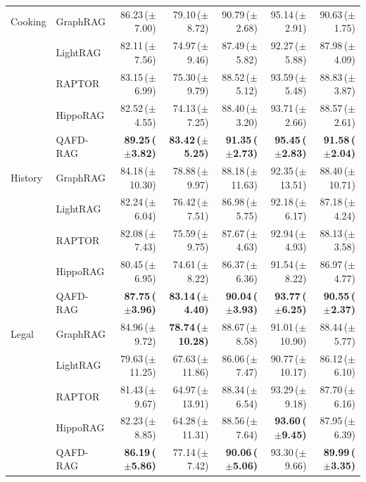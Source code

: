\documentclass{article} %
\newcommand{\score}[2]{#1\,($\pm$#2)}   %
\newcommand{\best}[1]{\textbf{#1}}      %
\begin{document}
\begin{table}[t]
{\begin{tabular}{llrrrrr}
\midrule
Cooking & GraphRAG  & \score{86.23}{7.00} & \score{79.10}{8.72} & \score{90.79}{2.68} & \score{95.14}{2.91} & \score{90.63}{1.75} \\
        & LightRAG  & \score{82.11}{7.56} & \score{74.97}{9.46} & \score{87.49}{5.82} & \score{92.27}{5.88} & \score{87.98}{4.09} \\
        & RAPTOR & \score{83.15}{6.99} & \score{75.30}{9.79} & \score{88.52}{5.12} & \score{93.59}{5.48} & \score{88.83}{3.87} \\
        & HippoRAG & \score{82.52}{4.55} & \score{74.13}{7.25} & \score{88.40}{3.20} & \score{93.71}{2.66} & \score{88.57}{2.61} \\
        & QAFD-RAG  & \best{\score{89.25}{3.82}} & \best{\score{83.42}{5.25}} & \best{\score{91.35}{2.73}} & \best{\score{95.45}{2.83}} & \best{\score{91.58}{2.04}} \\
\midrule
History & GraphRAG  & \score{84.18}{10.30} & \score{78.88}{9.97} & \score{88.18}{11.63} & \score{92.35}{13.51} & \score{88.40}{10.71} \\
        & LightRAG  & \score{82.24}{6.04}  & \score{76.42}{7.51}  & \score{86.98}{5.75}  & \score{92.18}{6.17}  & \score{87.18}{4.24} \\
        & RAPTOR & \score{82.08}{7.43} & \score{75.59}{9.75} & \score{87.67}{4.63} & \score{92.94}{4.93} & \score{88.13}{3.58} \\
        & HippoRAG & \score{80.45}{6.95} & \score{74.61}{8.22} & \score{86.37}{6.36} & \score{91.54}{8.22} & \score{86.97}{4.77} \\
        & QAFD-RAG  & \best{\score{87.75}{3.96}} & \best{\score{83.14}{4.40}} & \best{\score{90.04}{3.93}} & \best{\score{93.77}{6.25}} & \best{\score{90.55}{2.37}} \\
\midrule
Legal & GraphRAG  & \score{84.96}{9.72}  & \best{\score{78.74}{10.28}} & \score{88.67}{8.58}  & \score{91.01}{10.90} & \score{88.44}{5.77} \\
      & LightRAG  & \score{79.63}{11.25} & \score{67.63}{11.86} & \score{86.06}{7.47}  & \score{90.77}{10.17} & \score{86.12}{6.10} \\
      & RAPTOR & \score{81.43}{9.67} & \score{64.97}{13.91} & \score{88.34}{6.54} & \score{93.29}{9.18} & \score{87.70}{6.16} \\
      & HippoRAG & \score{82.23}{8.85} & \score{64.28}{11.31} & \score{88.56}{7.64} & \best{\score{93.60}{9.45}} & \score{87.95}{6.39} \\
      & QAFD-RAG  & \best{\score{86.19}{5.86}} & \score{77.14}{7.42} & \best{\score{90.06}{5.06}} & \score{93.30}{9.66} & \best{\score{89.99}{3.35}} \\
\bottomrule
\end{tabular}
}
\vspace{-.1cm}

\end{table}
\end{document}
